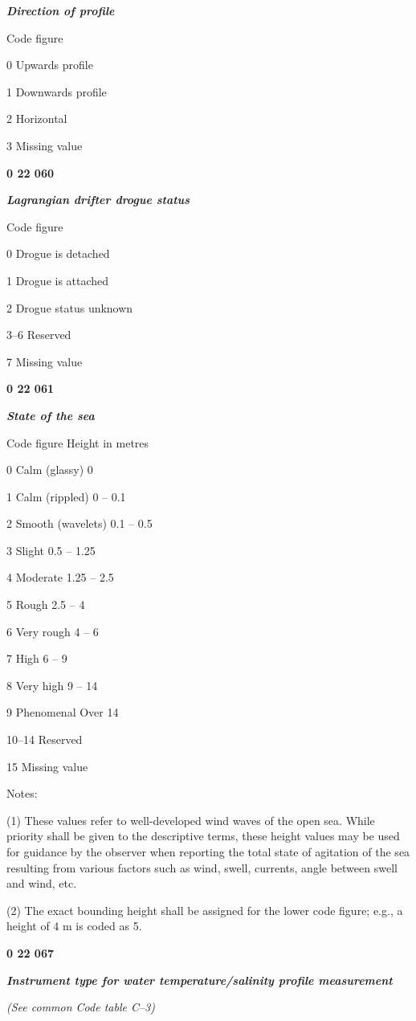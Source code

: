 \emph{\textbf{Direction of profile}}

Code figure

0 Upwards profile

1 Downwards profile

2 Horizontal

3 Missing value

\textbf{0 22 060}

\emph{\textbf{Lagrangian drifter drogue status}}

Code figure

0 Drogue is detached

1 Drogue is attached

2 Drogue status unknown

3--6 Reserved

7 Missing value

\textbf{0 22 061}

\emph{\textbf{State of the sea}}

Code figure Height in metres

0 Calm (glassy) 0

1 Calm (rippled) 0 -- 0.1

2 Smooth (wavelets) 0.1 -- 0.5

3 Slight 0.5 -- 1.25

4 Moderate 1.25 -- 2.5

5 Rough 2.5 -- 4

6 Very rough 4 -- 6

7 High 6 -- 9

8 Very high 9 -- 14

9 Phenomenal Over 14

10--14 Reserved

15 Missing value

Notes:

(1) These values refer to well-developed wind waves of the open sea. While priority shall be given to the descriptive terms, these height values may be used for guidance by the observer when reporting the total state of agitation of the sea resulting from various factors such as wind, swell, currents, angle between swell and wind, etc.

(2) The exact bounding height shall be assigned for the lower code figure; e.g., a height of 4 m is coded as 5.

\textbf{0 22 067}

\emph{\textbf{Instrument type for water temperature/salinity profile measurement}}

\emph{(See common Code table C--3)}

